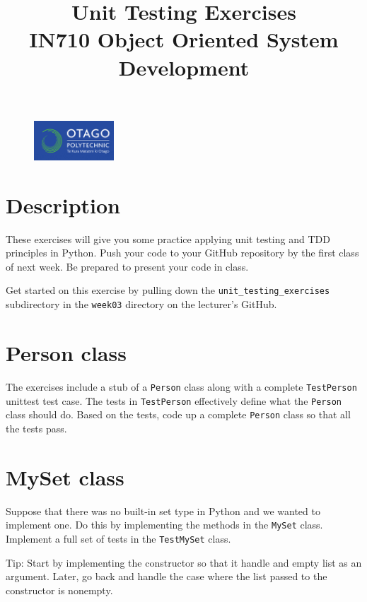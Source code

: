 \documentclass{article}
\begin{document}
\begin{figure}
\includegraphics[width=30mm]{../../../resources/images/oplogo.png}
\end{figure}

\title{Unit Testing Exercises\\IN710 Object Oriented System Development}
\date{}
\maketitle

\section*{Description}
These exercises will give you some practice applying unit testing and TDD principles
in Python. Push your code to your GitHub repository by the first class of next week.
Be prepared to present your code in class.

Get started on this exercise by pulling down the \texttt{unit\_testing\_exercises} subdirectory
in the \texttt{week03} directory on the lecturer's GitHub.

\section{Person class}
The exercises include a stub of a \texttt{Person} class along with a complete 
\texttt{TestPerson} unittest test case.  The tests in \texttt{TestPerson} 
effectively define what the \texttt{Person} class should do.  Based on the 
tests, code up a complete \texttt{Person} class so that all the tests pass.

\section{MySet class}
Suppose that there was no built-in set type in Python and we wanted
to implement one.  Do this by implementing the methods in the 
\texttt{MySet} class.  Implement a full set of tests in the \texttt{TestMySet}
class.

Tip:  Start by implementing the constructor so that it handle and empty list
as an argument.  Later, go back and handle the case where the list passed to
the constructor is nonempty.
\end{document}
